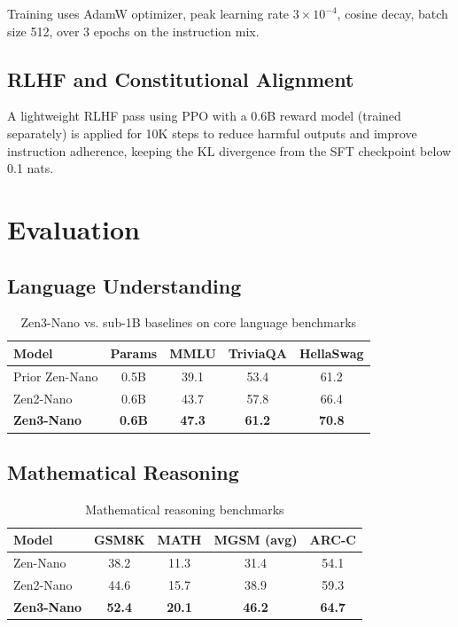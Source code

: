 \documentclass[11pt,a4paper]{article}
\begin{document}
Training uses AdamW optimizer, peak learning rate $3 \times 10^{-4}$, cosine decay,
batch size 512, over 3 epochs on the instruction mix.

\subsection{RLHF and Constitutional Alignment}

A lightweight RLHF pass using PPO with a 0.6B reward model (trained separately)
is applied for 10K steps to reduce harmful outputs and improve instruction adherence,
keeping the KL divergence from the SFT checkpoint below 0.1 nats.

\section{Evaluation}
\label{sec:eval}

\subsection{Language Understanding}

\begin{table}[H]
\centering
\caption{Zen3-Nano vs. sub-1B baselines on core language benchmarks}
\begin{tabular}{lcccc}
\toprule
\textbf{Model} & \textbf{Params} & \textbf{MMLU} & \textbf{TriviaQA} & \textbf{HellaSwag} \\
\midrule
Prior Zen-Nano     & 0.5B & 39.1 & 53.4 & 61.2 \\
Zen2-Nano          & 0.6B & 43.7 & 57.8 & 66.4 \\
\textbf{Zen3-Nano} & \textbf{0.6B} & \textbf{47.3} & \textbf{61.2} & \textbf{70.8} \\
\bottomrule
\end{tabular}
\label{tab:lang}
\end{table}

\subsection{Mathematical Reasoning}

\begin{table}[H]
\centering
\caption{Mathematical reasoning benchmarks}
\begin{tabular}{lcccc}
\toprule
\textbf{Model} & \textbf{GSM8K} & \textbf{MATH} & \textbf{MGSM (avg)} & \textbf{ARC-C} \\
\midrule
Zen-Nano     & 38.2 & 11.3 & 31.4 & 54.1 \\
Zen2-Nano    & 44.6 & 15.7 & 38.9 & 59.3 \\
\textbf{Zen3-Nano} & \textbf{52.4} & \textbf{20.1} & \textbf{46.2} & \textbf{64.7} \\
\bottomrule
\end{tabular}
\label{tab:math}
\end{table}
\end{document}
